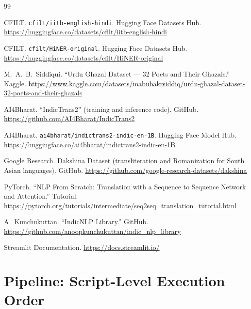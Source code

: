 \documentclass[11pt]{article}
\begin{document}
\begin{thebibliography}{99}

 CFILT. \texttt{cfilt/iitb-english-hindi}. Hugging Face Datasets Hub. \url{https://huggingface.co/datasets/cfilt/iitb-english-hindi}

 CFILT. \texttt{cfilt/HiNER-original}. Hugging Face Datasets Hub. \url{https://huggingface.co/datasets/cfilt/HiNER-original}

 M.~A.~B.~Siddiqui. ``Urdu Ghazal Dataset --- 32 Poets and Their Ghazals.'' Kaggle. \url{https://www.kaggle.com/datasets/mabubakrsiddiq/urdu-ghazal-dataset-32-poets-and-their-ghazals}

 AI4Bharat. ``IndicTrans2'' (training and inference code). GitHub. \url{https://github.com/AI4Bharat/IndicTrans2}

 AI4Bharat. \texttt{ai4bharat/indictrans2-indic-en-1B}. Hugging Face Model Hub. \url{https://huggingface.co/ai4bharat/indictrans2-indic-en-1B}

 Google Research. Dakshina Dataset (transliteration and Romanization for South Asian languages). GitHub. \url{https://github.com/google-research-datasets/dakshina}

 PyTorch. ``NLP From Scratch: Translation with a Sequence to Sequence Network and Attention.'' Tutorial. \url{https://pytorch.org/tutorials/intermediate/seq2seq_translation_tutorial.html}

 A.~Kunchukuttan. ``IndicNLP Library.'' GitHub. \url{https://github.com/anoopkunchukuttan/indic_nlp_library}

 Streamlit Documentation. \url{https://docs.streamlit.io/}

\end{thebibliography}

\vspace{12pt}

\appendix

\section{Pipeline: Script-Level Execution Order}
\label{app:pipeline}
\end{document}
